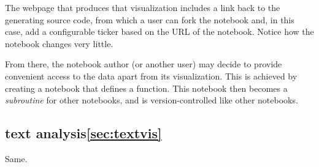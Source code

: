 The webpage that produces that visualization includes a link back to
the generating source code, from which a user can fork the notebook
and, in this case, add a configurable ticker based on the URL of
the notebook. Notice how the notebook changes very little.

From there, the notebook author (or another user) may decide to
provide convenient access to the data apart from its visualization.
This is achieved by creating a notebook that defines a function.
This notebook then becomes a \emph{subroutine} for other notebooks,
and is version-controlled like other notebooks.







\subsection{text analysis\ref{sec:textvis}}

Same.

%
